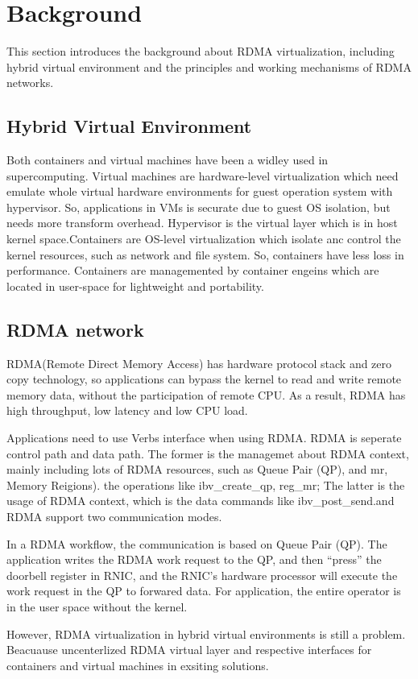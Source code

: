 \section{Background}
This section introduces the background about RDMA virtualization, including hybrid virtual environment and the principles and working mechanisms of RDMA networks.

\subsection{Hybrid Virtual Environment}	
Both containers and virtual machines have been a widley used in supercomputing. Virtual machines are hardware-level virtualization which need emulate whole virtual hardware environments for guest operation system with hypervisor. So, applications in VMs is securate due to guest OS isolation, but needs more transform overhead. Hypervisor is the virtual layer which is in host kernel space.Containers are OS-level virtualization which isolate anc control the kernel resources, such as network and file system. So, containers have less loss in performance. Containers are managemented by container engeins which are located in user-space for lightweight and portability.

\subsection{RDMA network}
RDMA(Remote Direct Memory Access) has hardware protocol stack and zero copy technology, so applications can bypass the kernel to read and write remote memory data, without the participation of remote CPU. As a result, RDMA has high throughput, low latency and low CPU load.

Applications need to use Verbs interface when using RDMA. RDMA is seperate control path and data path. The former is the managemet about RDMA context, mainly including lots of RDMA resources, such as Queue Pair (QP), and mr, Memory Reigions). the operations like ibv\_create\_qp, reg\_mr; The latter is the usage of RDMA context,  which is the data commands like ibv\_post\_send.and RDMA support two communication modes.

In a RDMA workflow, the communication is based on Queue Pair (QP). The application writes the RDMA work request to the QP, and then ``press''  the doorbell register in RNIC, and the RNIC's hardware processor will execute the work request in the QP to forwared data. For application, the entire operator is in the user space without the kernel.

However, RDMA virtualization in hybrid virtual environments is still a problem. Beacuause uncenterlized RDMA virtual layer and respective interfaces for containers and virtual machines in exsiting solutions. 

